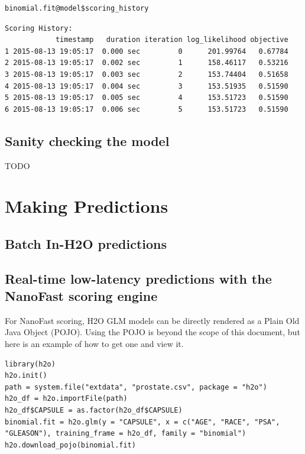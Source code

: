 \begin{lstlisting}[style=R]
binomial.fit@model$scoring_history
\end{lstlisting}
\begin{lstlisting}[style=output]
Scoring History:
            timestamp   duration iteration log_likelihood objective
1 2015-08-13 19:05:17  0.000 sec         0      201.99764   0.67784
2 2015-08-13 19:05:17  0.002 sec         1      158.46117   0.53216
3 2015-08-13 19:05:17  0.003 sec         2      153.74404   0.51658
4 2015-08-13 19:05:17  0.004 sec         3      153.51935   0.51590
5 2015-08-13 19:05:17  0.005 sec         4      153.51723   0.51590
6 2015-08-13 19:05:17  0.006 sec         5      153.51723   0.51590
\end{lstlisting}

\subsection{Sanity checking the model}

TODO


\section{Making Predictions}

\subsection{Batch In-H2O predictions}

\subsection{Real-time low-latency predictions with the NanoFast scoring engine}

For NanoFast scoring, H2O GLM models can be directly rendered as a Plain Old Java Object (POJO).  Using the POJO is
beyond the scope of this document, but here is an example of how to get one and view it.

\begin{lstlisting}[style=R]
library(h2o)
h2o.init()
path = system.file("extdata", "prostate.csv", package = "h2o")
h2o_df = h2o.importFile(path)
h2o_df$CAPSULE = as.factor(h2o_df$CAPSULE)
binomial.fit = h2o.glm(y = "CAPSULE", x = c("AGE", "RACE", "PSA", "GLEASON"), training_frame = h2o_df, family = "binomial")
h2o.download_pojo(binomial.fit)
\end{lstlisting}

